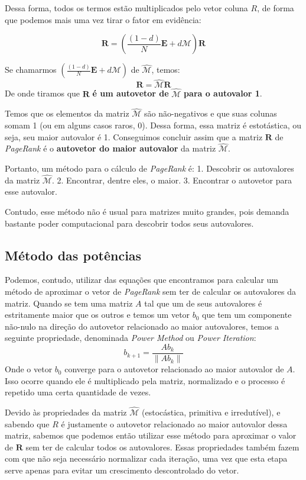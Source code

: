 \documentclass[11pt]{article}
\begin{document}
    Dessa forma, todos os termos estão multiplicados pelo vetor coluna
\(R\), de forma que podemos mais uma vez tirar o fator em evidência:

\[\displaystyle \mathbf {R} = (\frac{(1-d)}{N}\mathbf {E} + d \mathcal {M}) \mathbf {R}\]

    Se chamarmos \((\frac{(1-d)}{N}\mathbf {E} + d \mathcal {M})\) de
\(\widehat {\mathcal {M}}\), temos:
\[\displaystyle \mathbf {R} = \widehat {\mathcal {M}} \mathbf {R}\] De
onde tiramos que \(\mathbf{R}\) \textbf{é um autovetor de}
\(\widehat {\mathcal {M}}\) \textbf{para o autovalor 1}.

    Temos que os elementos da matriz \(\widehat {\mathcal {M}}\) são
não-negativos e que suas colunas somam 1 (ou em alguns casos raros, 0).
Dessa forma, essa matriz é estotástica, ou seja, seu maior autovalor é
1. Conseguimos concluir assim que a matriz \(\mathbf{R}\) de
\emph{PageRank} é o \textbf{autovetor do maior autovalor} da matriz
\(\widehat {\mathcal {M}}\).

    Portanto, um método para o cálculo de \emph{PageRank} é: 1. Descobrir os
autovalores da matriz \(\widehat {\mathcal {M}}\). 2. Encontrar, dentre
eles, o maior. 3. Encontrar o autovetor para esse autovalor.

Contudo, esse método não é usual para matrizes muito grandes, pois
demanda bastante poder computacional para descobrir todos seus
autovalores.

    \hypertarget{muxe9todo-das-potuxeancias}{%
\subsection{Método das potências}\label{muxe9todo-das-potuxeancias}}

Podemos, contudo, utilizar das equações que encontramos para calcular um
método de aproximar o vetor de \emph{PageRank} sem ter de calcular os
autovalores da matriz. Quando se tem uma matriz \(A\) tal que um de seus
autovalores é estritamente maior que os outros e temos um vetor \(b_0\)
que tem um componente não-nulo na direção do autovetor relacionado ao
maior autovalores, temos a seguinte propriedade, denominada \emph{Power
Method} ou \emph{Power Iteration}:
\[{\displaystyle b_{k+1}={\frac {Ab_{k}}{\|Ab_{k}\|}}}\] Onde o vetor
\(b_0\) converge para o autovetor relacionado ao maior autovalor de
\(A\). Isso ocorre quando ele é multiplicado pela matriz, normalizado e
o processo é repetido uma certa quantidade de vezes.

    Devido às propriedades da matriz \(\widehat {\mathcal {M}}\)
(estocástica, primitiva e irredutível), e sabendo que \(R\) é justamente
o autovetor relacionado ao maior autovalor dessa matriz, sabemos que
podemos então utilizar esse método para aproximar o valor de
\(\mathbf{R}\) sem ter de calcular todos os autovalores. Essas
propriedades também fazem com que não seja necessário normalizar cada
iteração, uma vez que esta etapa serve apenas para evitar um crescimento
descontrolado do vetor.
\end{document}
